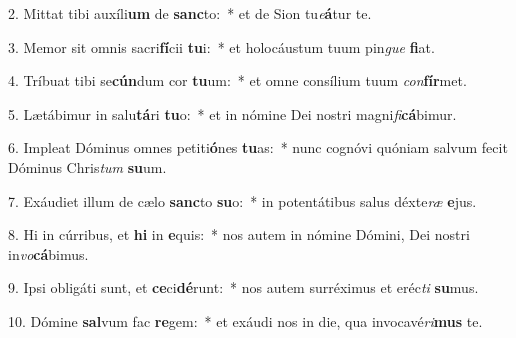 2. Mittat tibi auxíli\textbf{um} de \textbf{sanc}to:~*  et de Sion tu\textit{e}\textbf{á}tur te.\

3. Memor sit omnis sacri\textbf{fí}cii \textbf{tu}i:~*  et holocáustum tuum pin\textit{gue} \textbf{fi}at.\

4. Tríbuat tibi se\textbf{cún}dum cor \textbf{tu}um:~*  et omne consílium tuum \textit{con}\textbf{fír}met.\

5. Lætábimur in salu\textbf{tá}ri \textbf{tu}o:~*  et in nómine Dei nostri magni\textit{fi}\textbf{cá}bimur.\

6. Impleat Dóminus omnes petiti\textbf{ó}nes \textbf{tu}as:~*  nunc cognóvi quóniam salvum fecit Dóminus Chris\textit{tum} \textbf{su}um.\

7. Exáudiet illum de cælo \textbf{sanc}to \textbf{su}o:~*  in potentátibus salus déxte\textit{ræ} \textbf{e}jus.\

8. Hi in cúrribus, et \textbf{hi} in \textbf{e}quis:~*  nos autem in nómine Dómini, Dei nostri in\textit{vo}\textbf{cá}bimus.\

9. Ipsi obligáti sunt, et \textbf{ce}ci\textbf{dé}runt:~*  nos autem surréximus et eréc\textit{ti} \textbf{su}mus.\

10. Dómine \textbf{sal}vum fac \textbf{re}gem:~*  et exáudi nos in die, qua invocavé\textit{ri}\textbf{mus} te.\

